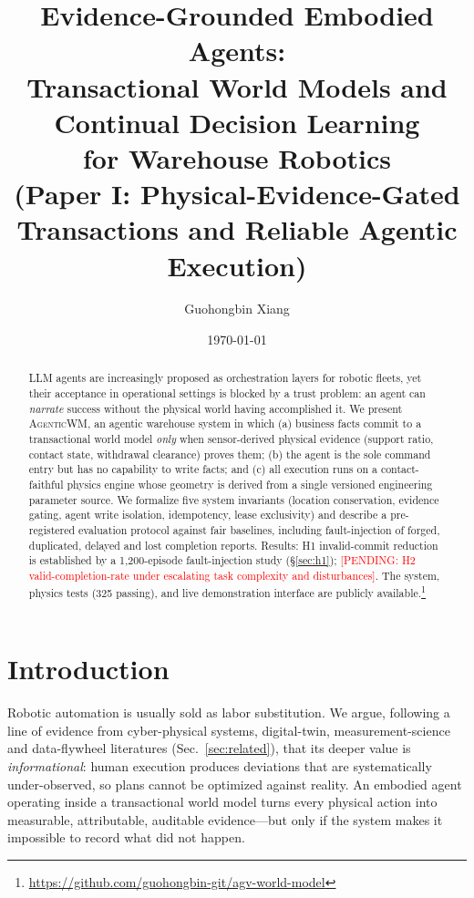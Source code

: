 \documentclass[11pt]{article}
\title{\textbf{Evidence-Grounded Embodied Agents:\\
Transactional World Models and Continual Decision Learning\\
for Warehouse Robotics}\\
\large (Paper I: Physical-Evidence-Gated Transactions and Reliable Agentic Execution)}
\author{Guohongbin Xiang \and \pending{co-authors, affiliation}}
\date{\today}
\newcommand{\pending}[1]{\textcolor{red}{[PENDING: #1]}}
\newcommand{\sys}{\textsc{AgenticWM}}
\begin{document}
\maketitle

\begin{abstract}
LLM agents are increasingly proposed as orchestration layers for robotic fleets,
yet their acceptance in operational settings is blocked by a trust problem:
an agent can \emph{narrate} success without the physical world having
accomplished it. We present \sys{}, an agentic warehouse system in which
(a) business facts commit to a transactional world model \emph{only} when
sensor-derived physical evidence (support ratio, contact state, withdrawal
clearance) proves them; (b) the agent is the sole command entry but has no
capability to write facts; and (c) all execution runs on a contact-faithful
physics engine whose geometry is derived from a single versioned engineering
parameter source. We formalize five system invariants
(location conservation, evidence gating, agent write isolation, idempotency,
lease exclusivity) and describe a pre-registered evaluation protocol against
fair baselines, including fault-injection of forged, duplicated, delayed and
lost completion reports.
Results: H1 invalid-commit reduction is established by a 1{,}200-episode
fault-injection study (\S\ref{sec:h1}); \pending{H2 valid-completion-rate under escalating task complexity and disturbances}.
The system, physics tests (325 passing), and live demonstration interface are
publicly available.\footnote{\url{https://github.com/guohongbin-git/agv-world-model}}
\end{abstract}

\section{Introduction}
Robotic automation is usually sold as labor substitution. We argue, following
a line of evidence from cyber-physical systems, digital-twin, measurement-science
and data-flywheel literatures (Sec.~\ref{sec:related}), that its deeper value is
\emph{informational}: human execution produces deviations that are systematically
under-observed, so plans cannot be optimized against reality. An embodied agent
operating inside a transactional world model turns every physical action into
measurable, attributable, auditable evidence---but only if the system makes it
impossible to record what did not happen.
\end{document}
